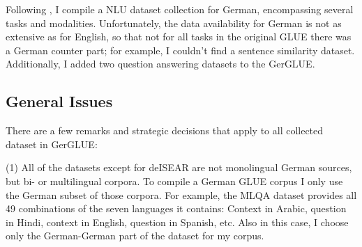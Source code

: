 Following \cite{wang2018glue}, I compile a NLU dataset collection for German, encompassing several
tasks and modalities. Unfortunately, the data availability for German is not as extensive as for English, so that
not for all tasks in the original GLUE there was a German counter part; for example, I couldn't find a sentence
similarity dataset. Additionally, I added two question answering datasets to the GerGLUE.


\subsection{General Issues}

There are a few remarks and strategic decisions that apply to all collected dataset in GerGLUE:

(1) All of the datasets except for deISEAR are not monolingual German sources, but bi- or
multilingual corpora. To compile a German GLUE corpus I only use the German subset of those
corpora. For example, the MLQA dataset provides all 49 combinations of the seven languages
it contains: Context in Arabic, question in Hindi, context in English, question in Spanish,
etc. Also in this case, I choose only the German-German part of the dataset for my corpus.

